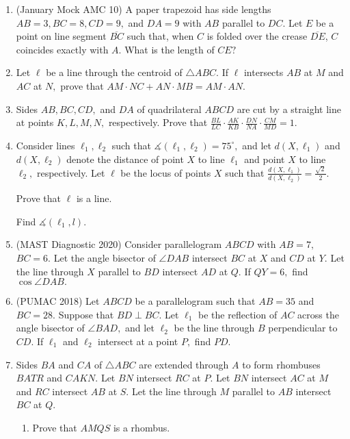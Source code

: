 \documentclass[mast]{lucky}
\begin{document}
\begin{enumerate}
    \item (January Mock AMC 10) A paper trapezoid has side lengths $AB = 3, BC = 8, CD = 9,$ and $DA = 9$ with $AB$ parallel to $DC$. Let $E$ be a point on line segment $\overline{BC}$ such that, when $C$ is folded over the crease $\overline{DE}$, $C$ coincides exactly with $A$. What is the length of $CE?$
    
    \item Let $\ell$ be a line through the centroid of $\triangle ABC.$ If $\ell$ intersects $AB$ at $M$ and $AC$ at $N,$ prove that $AM\cdot NC+AN\cdot MB=AM\cdot AN.$
    
    \item Sides $AB,BC,CD,$ and $DA$ of quadrilateral $ABCD$ are cut by a straight line at points $K,L,M,N,$ respectively. Prove that $\frac{BL}{LC}\cdot \frac{AK}{KB}\cdot \frac{DN}{NA}\cdot \frac{CM}{MD}=1.$
    
    \item Consider lines $\ell_1,\ell_2$ such that $\measuredangle(\ell_1,\ell_2)=75^{\circ},$ and let $d(X,\ell_1)$ and $d(X,\ell_2)$ denote the distance of point $X$ to line $\ell_1$ and point $X$ to line $\ell_2,$ respectively. Let $\ell$ be the locus of points $X$ such that $\frac{d(X,\ell_1)}{d(X,\ell_2)}=\frac{\sqrt{2}}{2}.$
    
    \begin{itemize}
        \Item Prove that $\ell$ is a line.
        
        \Item Find $\measuredangle(\ell_1,l).$
    \end{itemize}
    
    \item (MAST Diagnostic 2020) Consider parallelogram $ABCD$ with $AB=7,$ $BC=6.$ Let the angle bisector of $\angle DAB$ intersect $BC$ at $X$ and $CD$ at $Y.$ Let the line through $X$ parallel to $BD$ intersect $AD$ at $Q.$ If $QY=6,$ find $\cos\angle DAB.$
    
    \item (PUMAC 2018) Let $ABCD$ be a parallelogram such that $AB=35$ and $BC=28.$ Suppose that $BD\perp BC$. Let $\ell_1$ be the reflection of $AC$ across the angle bisector of $\angle BAD,$ and let $\ell_2$ be the line through $B$ perpendicular to $CD.$ If $\ell_1$ and $\ell_2$ intersect at a point $P,$ find $PD.$
    
    \item Sides $BA$ and $CA$ of $\triangle ABC$ are extended through $A$ to form rhombuses $BATR$ and $CAKN.$ Let $BN$ intersect $RC$ at $P.$ Let $BN$ intersect $AC$ at $M$ and $RC$ intersect $AB$ at $S.$ Let the line through $M$ parallel to $AB$ intersect $BC$ at $Q.$
    \begin{enumerate}
        \item Prove that $AMQS$ is a rhombus.
        

\end{enumerate}
\end{enumerate}
\end{document}
